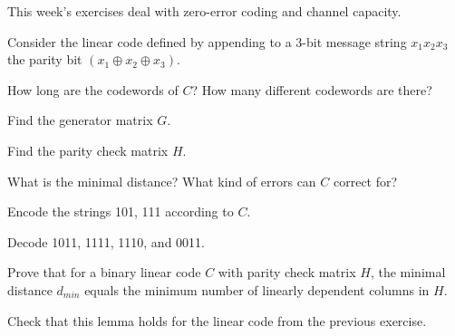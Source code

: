 \documentclass[a4paper,10pt,landscape,twocolumn]{scrartcl}
\begin{document}
\practiceproblems

{\sffamily\noindent
This week's exercises deal with zero-error coding and channel capacity. \practiceinstructions
}

\begin{exercise}
Consider the linear code defined by appending to a 3-bit message string $x_1x_2x_3$ the parity bit $(x_1 \oplus x_2 \oplus x_3)$.

\begin{subex}
How long are the codewords of $C$? How many different codewords are there?
\end{subex}

\begin{subex}
Find the generator matrix $G$.
\end{subex}

\begin{subex}
Find the parity check matrix $H$.
\end{subex}

\begin{subex}
What is the minimal distance? What kind of errors can $C$ correct for?
\end{subex}

\begin{subex}
Encode the strings 101, 111 according to $C$.
\end{subex}

\begin{subex}
Decode 1011, 1111, 1110, and 0011.
\end{subex}
\end{exercise}

\begin{exercise}
Prove that for a binary linear code $C$ with parity check matrix $H$, the minimal distance $d_{min}$ equals the minimum number of linearly dependent columns in $H$.

Check that this lemma holds for the linear code from the previous exercise.
\end{exercise}
\end{document}
